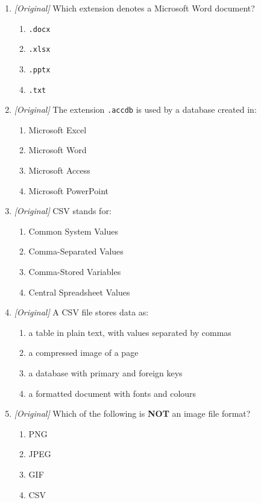\begin{enumerate}[label=\textbf{Q\arabic*.}, leftmargin=*]
\item \textit{[Original]} Which extension denotes a Microsoft Word document?
  \begin{enumerate}[label=\Alph*.]
    \item \texttt{.docx}
    \item \texttt{.xlsx}
    \item \texttt{.pptx}
    \item \texttt{.txt}
  \end{enumerate}
\item \textit{[Original]} The extension \texttt{.accdb} is used by a database
  created in:
  \begin{enumerate}[label=\Alph*.]
    \item Microsoft Excel
    \item Microsoft Word
    \item Microsoft Access
    \item Microsoft PowerPoint
  \end{enumerate}
\item \textit{[Original]} CSV stands for:
  \begin{enumerate}[label=\Alph*.]
    \item Common System Values
    \item Comma-Separated Values
    \item Comma-Stored Variables
    \item Central Spreadsheet Values
  \end{enumerate}
\item \textit{[Original]} A CSV file stores data as:
  \begin{enumerate}[label=\Alph*.]
    \item a table in plain text, with values separated by commas
    \item a compressed image of a page
    \item a database with primary and foreign keys
    \item a formatted document with fonts and colours
  \end{enumerate}
\item \textit{[Original]} Which of the following is \textbf{NOT} an image
  file format?
  \begin{enumerate}[label=\Alph*.]
    \item PNG
    \item JPEG
    \item GIF
    \item CSV
  \end{enumerate}

\end{enumerate}
